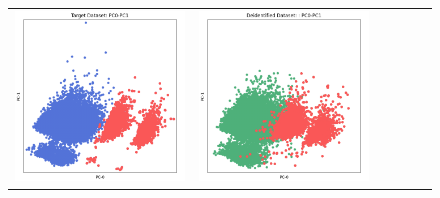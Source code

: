 \begin{figure}[p!]
\begin{tabular}{@{} M{0.166\textwidth} M{0.166\textwidth} | M{0.166\textwidth} M{0.166\textwidth} | M{0.166\textwidth} M{0.166\textwidth} @{}}
       \includegraphics[width=\linewidth]{z_AIM.orig.png} &
       \includegraphics[width=\linewidth]{z_AIM.syn.png} &

\end{tabular}
\end{figure}
